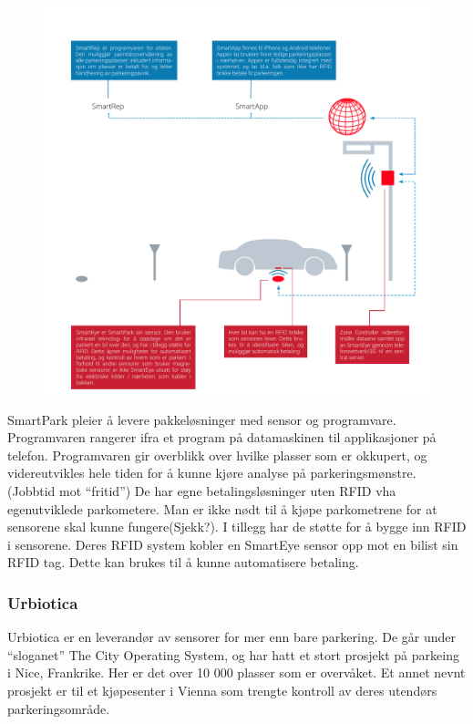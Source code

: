 \documentclass[a4paper, norsk, 12pt]{article}
\theoremstyle{remark}
\begin{document}
\begin{figure}[H]
\centering
\centerline{\includegraphics[scale=1.0, clip=true, trim=1cm 0cm 0.5cm 1.5cm]{grafikk/smartpark.pdf}}
\end{figure}

SmartPark pleier å levere pakkeløsninger med sensor og programvare. Programvaren rangerer ifra et program på datamaskinen til applikasjoner på telefon. Programvaren gir overblikk over hvilke plasser som er okkupert, og videreutvikles hele tiden for å kunne kjøre analyse på parkeringsmønstre. (Jobbtid mot “fritid”)
De har egne betalingsløsninger uten RFID vha egenutviklede parkometere. Man er ikke nødt til å kjøpe parkometrene for at sensorene skal kunne fungere(Sjekk?). I tillegg har de støtte for å bygge inn RFID i sensorene. Deres RFID system kobler en SmartEye sensor opp mot en bilist sin RFID tag. Dette kan brukes til å kunne automatisere betaling. 





\subsubsection{Urbiotica}
\label{ssub:urbiotica}
Urbiotica er en leverandør av sensorer for mer enn bare parkering. De går under “sloganet” The City Operating System, og har hatt et stort prosjekt på parkeing i Nice, Frankrike. Her er det over 10 000 plasser som er overvåket. Et annet nevnt prosjekt er til et kjøpesenter i Vienna som trengte kontroll av deres utendørs parkeringsområde. 
\end{document}
